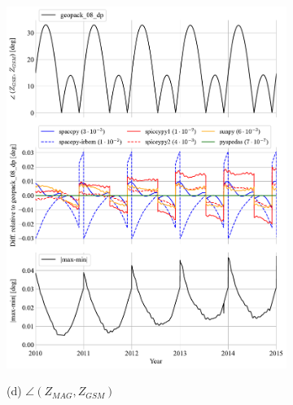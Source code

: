 \documentclass[draft]{agujournal2019}
\begin{document}
\begin{figure}[htb]
\begin{subfigure}[b]{0.49\textwidth}
         \includegraphics[width=\textwidth]{code/figures/angles/z-delta=1days_20100101-20150101/GSE_GSM.pdf}
     \end{subfigure}
     \begin{subfigure}[b]{0.49\textwidth}
         (d) $\angle (Z_{MAG}, Z_{GSM})$
         \centering

\end{subfigure}
\end{figure}
\end{document}
